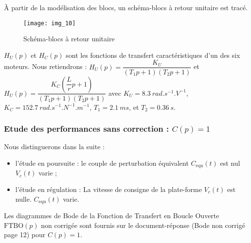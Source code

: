 

À partir de la modélisation des blocs, un schéma-blocs à retour unitaire est tracé.

\begin{figure}[H]
\centering
\texttt{[image: img\_10]}
\caption{Schéma-blocs à retour unitaire\label{img:10}}
\end{figure}

$H_U( p)$ et $H_C( p)$ sont les fonctions de transfert caractéristiques d’un des six moteurs. Nous retiendrons :
$H_U(p)=\dfrac{K_U}{\left(T_1p +1\right)\left(T_2p +1\right)}$ et $H_U(p)=\dfrac{K_C\left(\dfrac{L}{r}p +1\right)}{\left(T_1p +1\right)\left(T_2p +1\right)}$
avec 
$K_U = \SI{8,3}{rad . s ^{-1}.V ^{-1}}$, 
$K_C = \SI{152,7}{rad . s^{-1}.N^{-1} .m^{-1}}$, 
$T_1=\SI{2,1}{ms}$, 
et $T_2 =\SI{0,36}{s}$.

\subsubsection{Etude des performances sans correction : $C( p) =1$}
Nous distinguerons dans la suite :
\begin{itemize}
\item l’étude en poursuite : le couple de perturbation équivalent $C_{\text{equ}} (t)$ est nul $V_c (t)$ varie ;
\item l’étude en régulation : La vitesse de consigne de la plate-forme $V_c (t)$ est nulle. $C_{\text{equ}}(t)$ varie.
\end{itemize}

Les diagrammes de Bode de la Fonction de Transfert en Boucle Ouverte $\text{FTBO}( p)$ non corrigée sont fournis sur le document-réponse (Bode non corrigé page 12) pour $C( p) = 1$.


